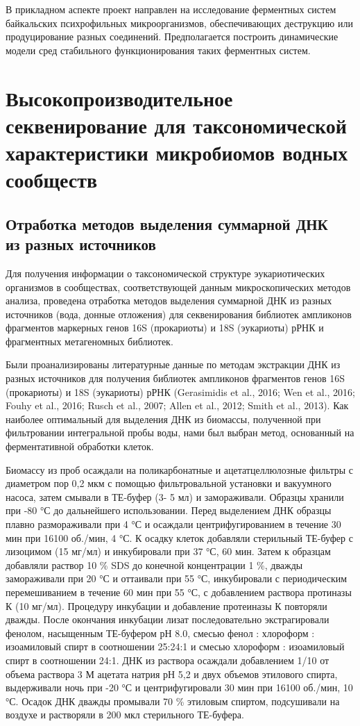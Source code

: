 \documentclass[a4paper,12pt,openany,final]{extreport}
\begin{document}
В прикладном аспекте проект направлен на исследование ферментных систем
байкальских психрофильных микроорганизмов, обеспечивающих деструкцию или
продуцирование разных соединений. Предполагается построить динамические
модели сред стабильного функционирования таких ферментных систем.

\chapter{Высокопроизводительное секвенирование для таксономической характеристики микробиомов водных сообществ}
\label{chap:1}

\section[Отработка методов выделения суммарной ДНК из разных источников]{Отработка методов выделения суммарной ДНК\\ из разных источников}

Для получения информации о таксономической структуре эукариотических
организмов в сообществах, соответствующей данным микроскопических
методов анализа, проведена отработка методов выделения суммарной ДНК из
разных источников (вода, донные отложения) для секвенирования библиотек
ампликонов фрагментов маркерных генов 16S (прокариоты) и 18S (эукариоты)
рРНК и фрагментных метагеномных библиотек.

Были проанализированы литературные данные по методам экстракции ДНК из
разных источников для получения библиотек ампликонов фрагментов генов
16S (прокариоты) и 18S (эукариоты) рРНК (Gerasimidis et al., 2016; Wen
et al., 2016; Fouhy et al., 2016; Rusch et al., 2007; Allen et al.,
2012; Smith et al., 2013). Как наиболее оптимальный для выделения ДНК из
биомассы, полученной при фильтровании интегральной пробы воды, нами был
выбран метод, основанный на ферментативной обработки клеток.

Биомассу из проб осаждали на поликарбонатные и ацетатцеллюлозные фильтры
с диаметром пор 0,2 мкм с помощью фильтровальной установки и вакуумного
насоса, затем смывали в ТЕ-буфер (3- 5 мл) и замораживали. Образцы
хранили при -80 °С до дальнейшего использовании. Перед выделением ДНК
образцы плавно размораживали при 4 °С и осаждали центрифугированием в
течение 30 мин при 16100 об./мин, 4 °С. К осадку клеток добавляли
стерильный ТЕ-буфер с лизоцимом (15 мг/мл) и инкубировали при 37 °С, 60
мин. Затем к образцам добавляли раствор 10 \% SDS до конечной
концентрации 1 \%, дважды замораживали при 20 °С и оттаивали при 55 °С,
инкубировали с периодическим перемешиванием в течение 60 мин при 55 °С,
с добавлением раствора протиназы К (10 мг/мл). Процедуру инкубации и
добавление протеиназы К повторяли дважды. После окончания инкубации
лизат последовательно экстрагировали фенолом, насыщенным ТЕ-буфером рН
8.0, смесью фенол : хлороформ : изоамиловый спирт в соотношении 25:24:1
и смесью хлороформ : изоамиловый спирт в соотношении 24:1. ДНК из
раствора осаждали добавлением 1/10 от объема раствора 3 М ацетата натрия
рН 5,2 и двух объемов этилового спирта, выдерживали ночь при -20 °С и
центрифугировали 30 мин при 16100 об./мин, 10 °С. Осадок ДНК дважды
промывали 70 \% этиловым спиртом, подсушивали на воздухе и растворяли в
200 мкл стерильного ТЕ-буфера.
\end{document}
